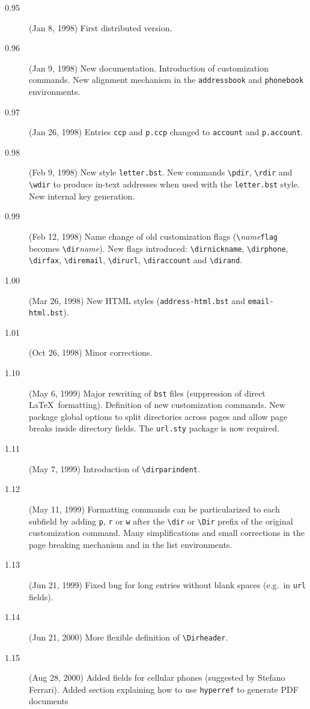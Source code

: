 \documentclass[10pt]{article}
\renewcommand{\Dirheader}[1]{\item\hspace{-\dirindent}\textbf{\MakeUppercase{#1}}}
\begin{document}
\begin{description}
\item[0.95] (Jan 8, 1998)
First distributed version.
\item[0.96] (Jan 9, 1998)
New documentation. Introduction of customization commands. New alignment
mechanism in the \texttt{addressbook} and \texttt{phonebook} environments.
\item[0.97] (Jan 26, 1998)
Entries \texttt{ccp} and \texttt{p.ccp} changed to \texttt{account} and
\texttt{p.account}.
\item[0.98] (Feb 9, 1998)
New style \texttt{letter.bst}. New commands \verb|\pdir|, \verb|\rdir| and
\verb|\wdir| to produce in-text addresses when used with the
\texttt{letter.bst} style. New internal key generation.
\item[0.99] (Feb 12, 1998)
Name change of old customization flags (\verb'\'\emph{name}\verb'flag' becomes
\verb'\dir'\emph{name}). New flags introduced: \verb|\dirnickname|, \verb|\dirphone|,
\verb|\dirfax|, \verb|\diremail|, \verb|\dirurl|, \verb|\diraccount| and
\verb|\dirand|.
\item[1.00] (Mar 26, 1998)
New HTML styles (\texttt{address-html.bst} and \texttt{email-html.bst}).
\item[1.01] (Oct 26, 1998)
Minor corrections.
\item[1.10] (May 6, 1999)
Major rewriting of \texttt{bst} files (suppression of direct \LaTeX\
formatting). Definition of new customization commands. New package global
options to split directories across pages and allow page breaks inside
directory fields. The \texttt{url.sty} package is now required.
\item[1.11] (May 7, 1999)
Introduction of \verb'\dirparindent'.
\item[1.12] (May 11, 1999)
Formatting commands can be particularized to each subfield by adding
\texttt{p}, \texttt{r} or \texttt{w} after the \verb'\dir' or \verb'\Dir'
prefix of the original customization command. Many simplifications and small
corrections in the page breaking mechanism and in the list environments.
\item[1.13] (Jun 21, 1999)
Fixed bug for long entries without blank spaces (e.g.\ in \texttt{url}
fields).
\item[1.14] (Jun 21, 2000)
More flexible definition of \verb|\Dirheader|.
\item[1.15] (Aug 28, 2000)
Added fields for cellular phones (suggested by Stefano Ferrari). Added
section explaining how to use \texttt{hyperref} to generate PDF documents

\end{description}
\end{document}

